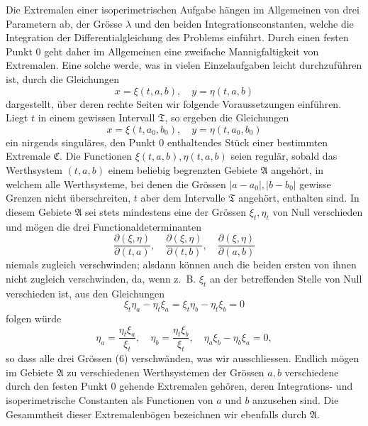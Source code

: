 \documentclass[11pt,a4paper,leqno]{article}
\begin{document}
Die Extremalen einer isoperimetrischen Aufgabe hängen im Allgemeinen von drei Parametern ab, der Grösse $\lambda$ und den beiden Integrationsconstanten, welche die Integration der Differentialgleichung des Problems einführt. Durch einen festen Punkt 0 geht daher im Allgemeinen eine zweifache Mannigfaltigkeit von Extremalen. Eine solche werde, was in vielen Einzelaufgaben leicht durchzuführen ist, durch die Gleichungen
\[
x=\xi(t,a,b),
\quad
 y=\eta(t,a,b)
\]
dargestellt, über deren rechte Seiten wir folgende Voraussetzungen einführen. Liegt $t$ in einem gewissen Intervall $\mathfrak{T}$, so ergeben die Gleichungen
\[
x=\xi(t,a_0,b_0),
\quad
 y=\eta(t,a_0,b_0)
\]
ein nirgends singuläres, den Punkt 0 enthaltendes Stück einer bestimmten Extremale $\mathfrak{C}$. Die Functionen $\xi(t,a,b),\eta(t,a,b)$ seien regulär, sobald das Werthsystem $(t,a,b)$ einem beliebig begrenzten Gebiete $\mathfrak{A}$ angehört, in welchem alle Werthsysteme, bei denen die Grössen $|a-a_0|,|b-b_0|$ gewisse Grenzen nicht überschreiten, $t$ aber dem Intervalle $\mathfrak{T}$ angehört, enthalten sind. In diesem Gebiete $\mathfrak{A}$ sei stets mindestens eine der Grössen $\xi_t,\eta_t$ von Null verschieden und mögen die drei Functionaldeterminanten
\begin{equation}\tag{6}
\frac{\partial(\xi,\eta)}{\partial(t,a)},
\quad
\frac{\partial(\xi,\eta)}{\partial(t,b)},
\quad
\frac{\partial(\xi,\eta)}{\partial(a,b)}
\end{equation}
niemals zugleich verschwinden; alsdann können auch die beiden ersten von ihnen nicht zugleich verschwinden, da, wenn z.~B. $\xi_t$ an der betreffenden Stelle von Null verschieden ist, aus den Gleichungen
\[
\xi_t\eta_a-\eta_t\xi_a=\xi_t\eta_b-\eta_t\xi_b=0
\]
folgen würde
\[
\eta_a=\frac{\eta_t\xi_a}{\xi_t},
\quad
\eta_b=\frac{\eta_t\xi_b}{\xi_t},
\quad
\eta_a\xi_b-\eta_b\xi_a=0,
\]
so dass alle drei Grössen (6) verschwänden, was wir ausschliessen. Endlich mögen im Gebiete $\mathfrak{A}$ zu verschiedenen Werthsystemen der Grössen $a,b$ verschiedene durch den festen Punkt 0 gehende Extremalen gehören, deren Integrations- und isoperimetrische Constanten als Functionen von $a$ und $b$ anzusehen sind. Die Gesammtheit dieser Extremalenbögen bezeichnen wir ebenfalls durch $\mathfrak{A}$.
\end{document}
